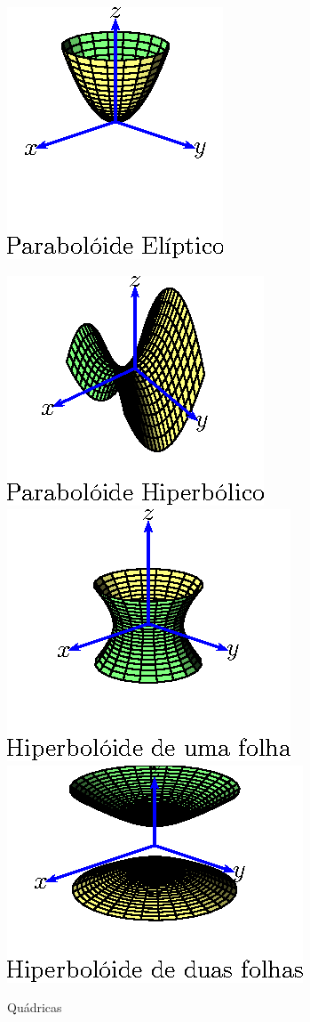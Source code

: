 \begin{ex}
\begin{figure}[htp]
\includegraphics{cap_superficies/figs/figura_4}

\includegraphics{cap_superficies/figs/figura_5}
\includegraphics{cap_superficies/figs/figura_6}
\includegraphics{cap_superficies/figs/figura_7} \caption{\label{quadricas}Quádricas}
\end{figure}


\end{ex}
